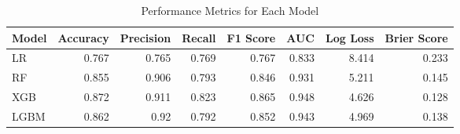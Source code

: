 \begin{table}[H]\centering
\caption{Performance Metrics for Each Model}
\label{Table 3 :performance_metrics}
\begin{tabular}{lrrrrrrr}
\toprule
Model & Accuracy & Precision & Recall & F1 Score & AUC & Log Loss & Brier Score \\
\midrule
LR & 0.767 & 0.765 & 0.769 & 0.767 & 0.833 & 8.414 & 0.233 \\
RF & 0.855 & 0.906 & 0.793 & 0.846 & 0.931 & 5.211 & 0.145 \\
XGB & 0.872 & 0.911 & 0.823 & 0.865 & 0.948 & 4.626 & 0.128 \\
LGBM & 0.862 & 0.92 & 0.792 & 0.852 & 0.943 & 4.969 & 0.138 \\
\bottomrule
\end{tabular}
\end{table}
